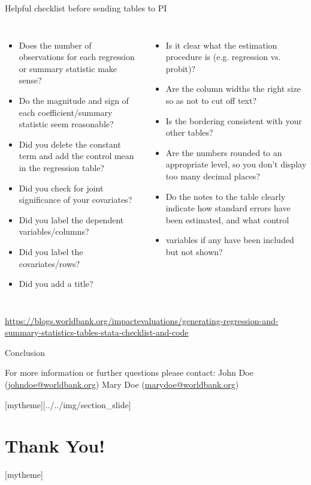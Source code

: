 \documentclass[aspectratio=169]{beamer}
\newcommand{\sectionpic}[2]{
	\setbeamertemplate{section page}[mytheme][#2]
	\section{#1}
	\setbeamertemplate{section page}[mytheme]
}
\begin{document}
\begin{frame}[fragile]{Helpful checklist before sending tables to PI}
	\begin{columns}[t]
		\begin{itemize}
			\item \scriptsize Does the number of observations for each regression or summary statistic make sense?
			\item \scriptsize Do the magnitude and sign of each coefficient/summary statistic seem reasonable?
			\item \scriptsize Did you delete the constant term and add the control mean in the regression table?
			\item \scriptsize Did you check for joint significance of your covariates?
			\item \scriptsize Did you label the dependent variables/columns?
			\item \scriptsize Did you label the covariates/rows?
			\item \scriptsize Did you add a title?
		\end{itemize}
		\begin{itemize}
			\item \scriptsize Is it clear what the estimation procedure is (e.g. regression vs. probit)?
			\item \scriptsize Are the column widths the right size so as not to cut off text?
			\item \scriptsize Is the bordering consistent with your other tables?
			\item \scriptsize Are the numbers rounded to an appropriate level, so you don’t display too many decimal places?
			\item \scriptsize Do the notes to the table clearly indicate how standard errors have been estimated, and what control \item variables if any have been included but not shown?
		\end{itemize}
	\end{columns}
	\vspace{.1cm}
	\scriptsize  \url{https://blogs.worldbank.org/impactevaluations/generating-regression-and-summary-statistics-tables-stata-checklist-and-code}
\end{frame}

\begin{frame}{Conclusion}


\vspace{20mm}
For more information or further questions please contact:
\newline John Doe (\url{johndoe@worldbank.org}) \newline Mary Doe (\url{marydoe@worldbank.org})

\end{frame}

\sectionpic{Thank You!}{../../img/section_slide}
\end{document}
